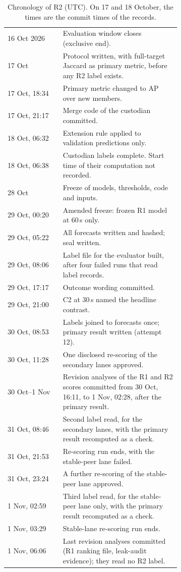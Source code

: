 \begin{table}[h]
\footnotesize
\centering
\caption{Chronology of R2 (UTC). On 17 and 18 October, the times are the commit times of the records.}
\label{tab:chronology}
\setlength{\tabcolsep}{3pt}
\begin{tabular}{@{}lp{0.68\linewidth}@{}}
\toprule
16 Oct 2026 & Evaluation window closes (exclusive end). \\
17 Oct & Protocol written, with full-target Jaccard as primary metric, before any R2 label exists. \\
17 Oct, 18:34 & Primary metric changed to AP over new members. \\
17 Oct, 21:17 & Merge code of the custodian committed. \\
18 Oct, 06:32 & Extension rule applied to validation predictions only. \\
18 Oct, 06:38 & Custodian labels complete. Start time of their computation not recorded. \\
28 Oct & Freeze of models, thresholds, code and inputs. \\
29 Oct, 00:20 & Amended freeze: frozen R1 model at 60\,s only. \\
29 Oct, 05:22 & All forecasts written and hashed; seal written. \\
29 Oct, 08:06 & Label file for the evaluator built, after four failed runs that read label records. \\
29 Oct, 17:17 & Outcome wording committed. \\
29 Oct, 21:00 & C2 at 30\,s named the headline contrast. \\
30 Oct, 08:53 & Labels joined to forecasts once; primary result written (attempt 12). \\
30 Oct, 11:28 & One disclosed re-scoring of the secondary lanes approved. \\
30 Oct--1 Nov & Revision analyses of the R1 and R2 scores committed from 30 Oct, 16:11, to 1 Nov, 02:28, after the primary result. \\
31 Oct, 08:46 & Second label read, for the secondary lanes, with the primary result recomputed as a check. \\
31 Oct, 21:53 & Re-scoring run ends, with the stable-peer lane failed. \\
31 Oct, 23:24 & A further re-scoring of the stable-peer lane approved. \\
1 Nov, 02:59 & Third label read, for the stable-peer lane only, with the primary result recomputed as a check. \\
1 Nov, 03:29 & Stable-lane re-scoring run ends. \\
1 Nov, 06:06 & Last revision analyses committed (R1 ranking file, leak-audit evidence); they read no R2 label. \\
\bottomrule
\end{tabular}
\end{table}
